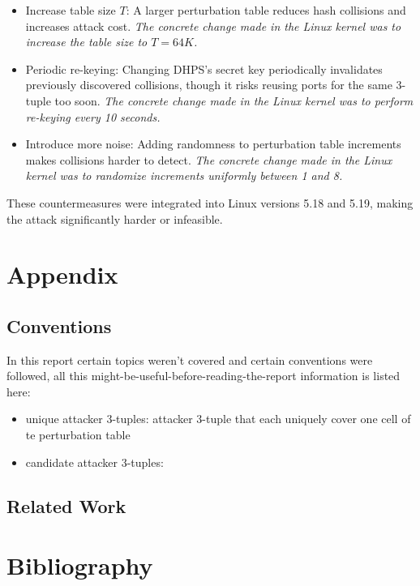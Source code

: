 \documentclass{report}
\begin{document}
\begin{itemize}
    \item \alert{Increase table size $T$:}  
    A larger perturbation table reduces hash collisions and increases attack cost.  
    \textit{The concrete change made in the Linux kernel was to increase the table size to $T = 64K$.}

    \item \alert{Periodic re-keying:}  
    Changing DHPS’s secret key periodically invalidates previously discovered collisions, though it risks reusing ports for the same 3-tuple too soon.  
    \textit{The concrete change made in the Linux kernel was to perform re-keying every 10 seconds.}

    \item \alert{Introduce more noise:}  
    Adding randomness to perturbation table increments makes collisions harder to detect.  
    \textit{The concrete change made in the Linux kernel was to randomize increments uniformly between 1 and 8.}
\end{itemize}

These countermeasures were integrated into Linux versions 5.18 and 5.19, making the attack significantly harder or infeasible.

\vspace{0.5cm}
\chapter{Appendix}
\label{sec:appendix}

\section{Conventions}
\label{sec:conventions}

In this report certain topics weren't covered and certain conventions were followed, all this might-be-useful-before-reading-the-report information is listed here:
\begin{itemize}
	\item \alert{unique attacker 3-tuples}: attacker 3-tuple that each uniquely cover one cell of te perturbation table
	\item \alert{candidate attacker 3-tuples}:
\end{itemize}

\section{Related Work}
\label{sec:related work}

\vspace{0.5cm}
\chapter{Bibliography}
\label{sec:bibliography}

\printbibliography[heading=none]

\end{document}
